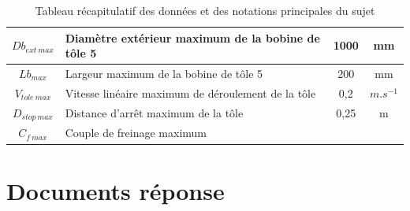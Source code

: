 \begin{table}
\begin{tabular}{|c|l|c|c|}
$Db_{ext\ max}$ & Diamètre extérieur maximum de la bobine de tôle 5 & 1000 & mm  \\ \hline
$Lb_{max}$ & Largeur maximum de la bobine de tôle 5 & 200 & mm  \\ \hline
$V_{tole\ max}$ & Vitesse linéaire maximum de déroulement de la tôle & 0,2 & $m.s^{-1}$ \\ \hline
$D_{stop\ max}$ & Distance d'arrêt maximum de la tôle & 0,25 & m \\ \hline
$C_{f\ max}$ & Couple de freinage maximum & &  \\ \hline
\end{tabular}
\caption{Tableau récapitulatif des données et des notations principales du sujet}
\end{table}

\newpage

\pagestyle{empty}



\newpage
\cleardoublepage

\pagestyle{documentreponse}

\section{Documents réponse}

